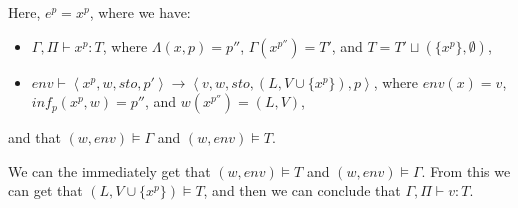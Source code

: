 \item[\runa{Var}] Here, $e^p=x^p$, where we have:
			\begin{itemize}
				\item $\Gamma,\Pi\vdash x^p:T$, where $\Lambda(x,p)=p''$, $\Gamma(x^{p''})=T'$, and $T=T'\sqcup(\{x^p\},\emptyset)$,
				\item $env\vdash\left\langle x^p,w,sto,p'\right\rangle\rightarrow\left\langle v,w,sto,(L,V\cup\{x^p\}),p\right\rangle$, where $env(x)=v$, $inf_p(x^p,w)=p''$, and $w(x^{p''})=(L,V)$,
			\end{itemize}
			and that $(w,env)\models\Gamma$ and $(w,env)\models T$.

			We can the immediately get that $(w,env)\models T$ and $(w,env)\models \Gamma$.
			From this we can get that $(L,V\cup\{x^p\})\models T$, and then we can conclude that $\Gamma,\Pi\vdash v:T$.
